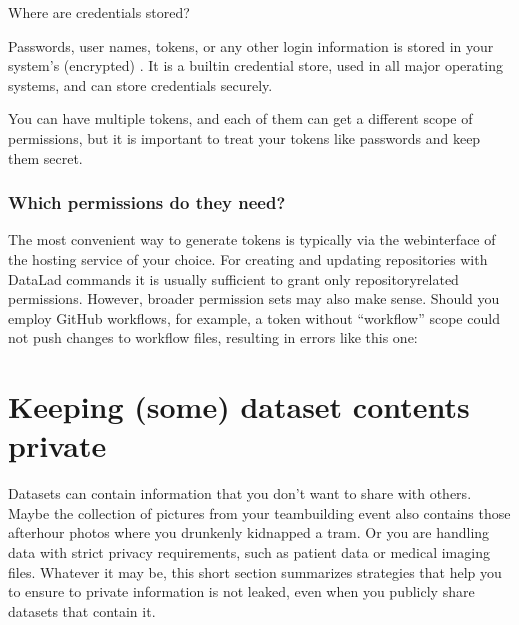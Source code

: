 \ignorespaces \begin{findoutmore}[label={fom-credential-storage}, before title={\thetcbcounter\ }, float, floatplacement=tb, check odd page=true]{Where are credentials stored?}
\label{\detokenize{basics/101-139-hostingservices:fom-credential-storage}}

\sphinxAtStartPar
Passwords, user names, tokens, or any other login information is stored in
your system’s (encrypted) .
It is a built\sphinxhyphen{}in credential store, used in all major operating systems, and
can store credentials securely.


\end{findoutmore}

\sphinxAtStartPar
You can have multiple tokens, and each of them can get a different scope of permissions, but it is important to treat your tokens like passwords and keep them secret.


\subsubsection{Which permissions do they need?}
\label{\detokenize{basics/101-139-hostingservices:which-permissions-do-they-need}}
\sphinxAtStartPar
The most convenient way to generate tokens is typically via the webinterface of the hosting service of your choice.
For creating and updating repositories with DataLad commands it is usually sufficient to grant only repository\sphinxhyphen{}related permissions.
However, broader permission sets may also make sense.
Should you employ GitHub workflows, for example, a token without “workflow” scope could not push changes to workflow files, resulting in errors like this one:

\begin{sphinxVerbatim}[commandchars=\\\{\}]
\PYG{g+go}{[remote rejected] (refusing to allow a Personal Access Token to create or update workflow `.github/workflows/benchmarks.yml` without `workflow` scope)]}
\end{sphinxVerbatim}

\sphinxstepscope


\section{Keeping (some) dataset contents private}
\label{\detokenize{basics/101-139-privacy:keeping-some-dataset-contents-private}}\label{\detokenize{basics/101-139-privacy:privacy}}\label{\detokenize{basics/101-139-privacy::doc}}
\sphinxAtStartPar
Datasets can contain information that you don’t want to share with others.
Maybe the collection of pictures from your team\sphinxhyphen{}building event also contains those after\sphinxhyphen{}hour photos where you drunkenly kidnapped a tram.
Or you are handling data with strict privacy requirements, such as patient data or
medical imaging files.
Whatever it may be, this short section summarizes strategies that help you to ensure
to private information is not leaked, even when you publicly share datasets that contain it.


